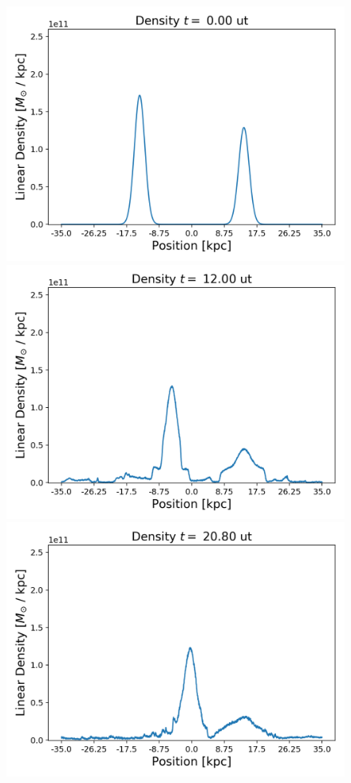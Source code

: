 \begin{figure}[h!]
    \centering
    \includegraphics[scale=0.45]{imag/cBulletD0.png}
    \includegraphics[scale=0.45]{imag/cBulletD30.png}
    \includegraphics[scale=0.45]{imag/cBulletD52.png}

\end{figure}
